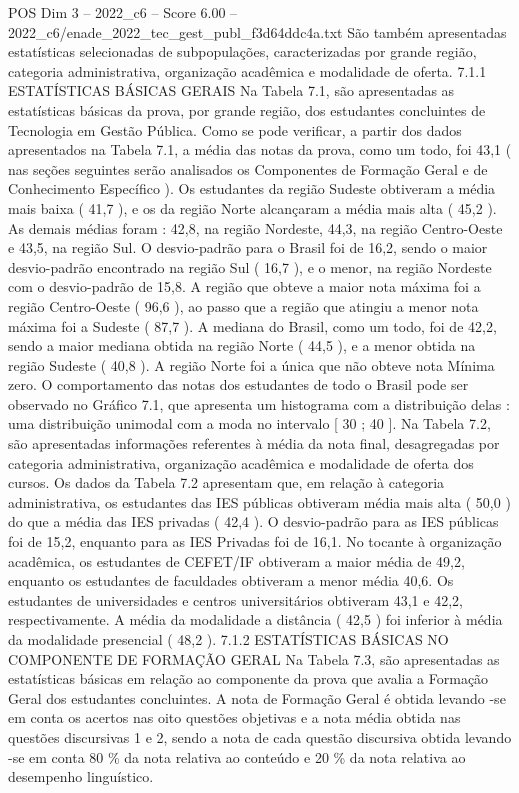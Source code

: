 \begin{textsample}{POS Dim 3 – 2022\_c6 – Score 6.00 – 2022\_c6/enade\_2022\_tec\_gest\_publ\_f3d64ddc4a.txt}
São também apresentadas estatísticas selecionadas de subpopulações, caracterizadas por grande região, categoria administrativa, organização acadêmica e modalidade de oferta. 7.1.1 ESTATÍSTICAS BÁSICAS GERAIS Na Tabela 7.1, são apresentadas as estatísticas básicas da prova, por grande região, dos estudantes concluintes de Tecnologia em Gestão Pública.
Como se pode verificar, a partir dos dados apresentados na Tabela 7.1, a média das notas da prova, como um todo, foi 43,1 ( nas seções seguintes serão analisados os Componentes de Formação Geral e de Conhecimento Específico ).
Os estudantes da região Sudeste obtiveram a média mais baixa ( 41,7 ), e os da região Norte alcançaram a média mais alta ( 45,2 ).
As demais médias foram : 42,8, na região Nordeste, 44,3, na região Centro-Oeste e 43,5, na região Sul.
O desvio-padrão para o Brasil foi de 16,2, sendo o maior desvio-padrão encontrado na região Sul ( 16,7 ), e o menor, na região Nordeste com o desvio-padrão de 15,8.
A região que obteve a maior nota máxima foi a região Centro-Oeste ( 96,6 ), ao passo que a região que atingiu a menor nota máxima foi a Sudeste ( 87,7 ).
A mediana do Brasil, como um todo, foi de 42,2, sendo a maior mediana obtida na região Norte ( 44,5 ), e a menor obtida na região Sudeste ( 40,8 ).
A região Norte foi a única que não obteve nota Mínima zero.
O comportamento das notas dos estudantes de todo o Brasil pode ser observado no Gráfico 7.1, que apresenta um histograma com a distribuição delas : uma distribuição unimodal com a moda no intervalo [ 30 ; 40 ].
Na Tabela 7.2, são apresentadas informações referentes à média da nota final, desagregadas por categoria administrativa, organização acadêmica e modalidade de oferta dos cursos.
Os dados da Tabela 7.2 apresentam que, em relação à categoria administrativa, os estudantes das IES públicas obtiveram média mais alta ( 50,0 ) do que a média das IES privadas ( 42,4 ).
O desvio-padrão para as IES públicas foi de 15,2, enquanto para as IES Privadas foi de 16,1.
No tocante à organização acadêmica, os estudantes de CEFET/IF obtiveram a maior média de 49,2, enquanto os estudantes de faculdades obtiveram a menor média 40,6.
Os estudantes de universidades e centros universitários obtiveram 43,1 e 42,2, respectivamente.
A média da modalidade a distância ( 42,5 ) foi inferior à média da modalidade presencial ( 48,2 ). 7.1.2 ESTATÍSTICAS BÁSICAS NO COMPONENTE DE FORMAÇÃO GERAL Na Tabela 7.3, são apresentadas as estatísticas básicas em relação ao componente da prova que avalia a Formação Geral dos estudantes concluintes.
A nota de Formação Geral é obtida levando -se em conta os acertos nas oito questões objetivas e a nota média obtida nas questões discursivas 1 e 2, sendo a nota de cada questão discursiva obtida levando -se em conta 80 \% da nota relativa ao conteúdo e 20 \% da nota relativa ao desempenho linguístico.

\end{textsample}
